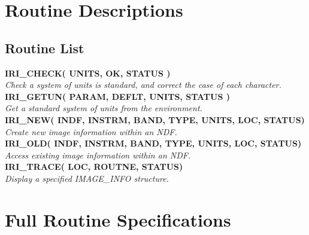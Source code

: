 \appendix
\section{Routine Descriptions}

\newcommand{\noteroutine}[2]{{\small \bf #1} \\
                              \hspace*{3em} {\em #2} \\[1.5ex]}

\subsection {Routine List}
\noteroutine{IRI\_CHECK( UNITS, OK, STATUS )}
   {Check a system of units is standard, and correct the case of each character.}
\noteroutine{IRI\_GETUN( PARAM, DEFLT, UNITS, STATUS )}
   {Get a standard system of units from the environment.}
\noteroutine{IRI\_NEW( INDF, INSTRM, BAND, TYPE, UNITS, LOC, STATUS)}
   {Create new image information within an NDF.}
\noteroutine{IRI\_OLD( INDF, INSTRM, BAND, TYPE, UNITS, LOC, STATUS)}
   {Access existing image information within an NDF.}
\noteroutine{IRI\_TRACE( LOC, ROUTNE, STATUS)}
   {Display a specified IMAGE\_INFO structure.}

\section{Full Routine Specifications}
\label {SEC:FULLSPEC}
\newlength{\sstbannerlength}
\newlength{\sstcaptionlength}
\newcommand{\sstroutine}[3]{
   \goodbreak
   \rule{\textwidth}{0.5mm}
   \vspace{-7ex}
   \newline
   \settowidth{\sstbannerlength}{{\Large {\bf #1}}}
   \setlength{\sstcaptionlength}{\textwidth}
   \addtolength{\sstbannerlength}{0.5em} 
   \addtolength{\sstcaptionlength}{-2.0\sstbannerlength}
   \addtolength{\sstcaptionlength}{-4.45pt}
   \parbox[t]{\sstbannerlength}{\flushleft{\Large {\bf #1}}}
   \parbox[t]{\sstcaptionlength}{\center{\Large #2}}
   \parbox[t]{\sstbannerlength}{\flushright{\Large {\bf #1}}}
   \begin{description}
      #3
   \end{description}
}

\newcommand{\sstdescription}[1]{\item[Description:] #1}


